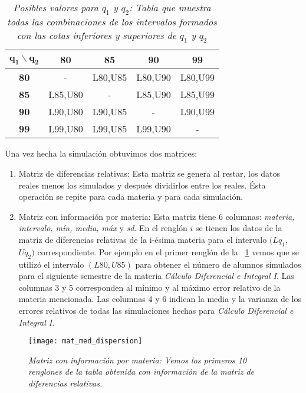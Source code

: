 \begin{table}[H]
\centering
\begin{tabular}{|c|c|c|c|c|}
\hline 
$\textbf{q}_{\textbf{1}} \backslash \textbf{q}_{\textbf{2}}$ & \textbf{80} & \textbf{85} & \textbf{90} & \textbf{99} \\ 
\hline 
\textbf{80} & - & L80,U85 & L80,U90 & L80,U99 \\ 
\hline 
\textbf{85} & L85,U80 & - & L85,U90 & L85,U99 \\ 
\hline 
\textbf{90} & L90,U80 & L90,U85 & - & L90,U99 \\ 
\hline 
\textbf{99} & L99,U80 & L99,U85 & L99,U90 & - \\ 
\hline 
\end{tabular} 
\caption[\textit{Posibles valores para $q_{1}$ y $q_{2}$}]{\textit{Posibles valores para $q_{1}$ y $q_{2}$: Tabla que muestra todas las combinaciones de los intervalos formados con las cotas inferiores y superiores de $q_{1}$ y $q_{2}$}}\label{valoresQ1Q2}
\end{table}


Una vez hecha la simulación obtuvimos dos matrices:

\begin{enumerate}
\item Matriz de diferencias relativas: Esta matriz se genera al restar, los datos reales menos los simulados y después dividirlos entre los reales. Ésta operación se repite para cada materia y para cada simulación.

\item Matriz con información por materia: Esta matriz tiene 6 columnas: \textit{materia, intervalo, mín, media, máx} y \textit{sd}. En el renglón $i$ se tienen los datos de la matriz de diferencias relativas de la i-ésima materia para el intervalo $(Lq_{1}$,$Uq_{2})$ correspondiente. Por ejemplo en el primer renglón de la \figurename{~\ref{matMedDispersion}} vemos que se utilizó el intervalo $(L80,U85)$ para obtener el número de alumnos simulados para el siguiente semestre de la materia \textit{Cálculo Diferencial e Integral I}. Las columnas 3 y 5 corresponden al mínimo y al máximo error relativo de la materia mencionada. Las columnas 4 y 6 indican la media y la varianza de los errores relativos de todas las simulaciones hechas para \textit{Cálculo Diferencial e Integral I}.
\end{enumerate}



\begin{figure}[H]
\centering
\texttt{[image: mat\_med\_dispersion]} %
\caption[\textit{Matriz con información por materia}]{\textit{Matriz con información por materia: Vemos los primeros 10 renglones de la tabla obtenida con información de la matriz de diferencias relativas.}}\label{matMedDispersion}
\end{figure}


